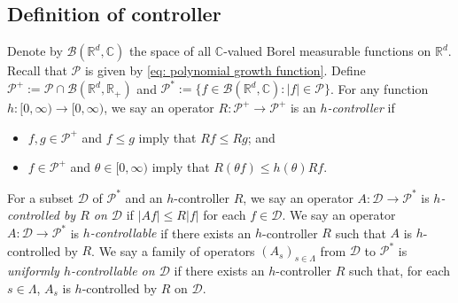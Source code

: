 \documentclass[12pt,a4paper]{amsart}
\theoremstyle{plain}
\theoremstyle{definition}
\numberwithin{equation}{section}
\begin{document}
\subsection{Definition of controller}
\label{sec: controller}
	Denote by $\mathcal B(\mathbb R^d, \mathbb C)$ the space of all $\mathbb C$-valued Borel measurable functions on $\mathbb R^d$.
	Recall that $\mathcal P$ is given by \eqref{eq: polynomial growth function}.
    Define $\mathcal P^+:= \mathcal P \cap \mathcal B(\mathbb R^d, \mathbb R_+)$ and $\mathcal P^*:= \{f\in \mathcal B(\mathbb R^d, \mathbb C): |f|\in \mathcal P\}$.
    For any function $h: [0,\infty) \to [0,\infty)$, we say an operator $R: \mathcal P^+ \to \mathcal P^+$ is an \emph{$h$-controller} if
\begin{itemize}
\item
    $f, g\in \mathcal P^+$ and $f\leq g$ imply that $Rf \leq Rg$; and
\item
    $f \in \mathcal P^+$ and $\theta \in [0,\infty)$ imply that $ R (\theta f)\leq h(\theta) Rf$.
\end{itemize}
       For a subset $\mathcal D$ of $\mathcal P^*$ and an $h$-controller $R$, we say an operator $A : \mathcal D \to \mathcal P^*$ is \emph{$h$-controlled by $R$ on $\mathcal D$} if $|Af| \leq R|f|$ for each $f\in \mathcal D$.
    We say an operator $A : \mathcal D \to \mathcal P^*$ is \emph{$h$-controllable} if there exists an $h$-controller $R$ such that $A$ is $h$-controlled by $R$.
     We say a family of operators $(A_s)_{s\in \Lambda}$ from $\mathcal D $ to $\mathcal P^*$ is \emph{uniformly $h$-controllable on $\mathcal D$} if there exists an $h$-controller $R$ such that, for each $s\in \Lambda$, $A_s$ is $h$-controlled by $R$ on $\mathcal D$.
\end{document}

